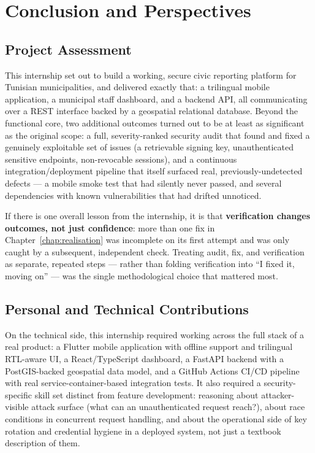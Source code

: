 \chapter{Conclusion and Perspectives}
\label{chap:conclusion}

\section{Project Assessment}

This internship set out to build a working, secure civic reporting platform for Tunisian municipalities, and delivered exactly that: a trilingual mobile application, a municipal staff dashboard, and a backend API, all communicating over a REST interface backed by a geospatial relational database. Beyond the functional core, two additional outcomes turned out to be at least as significant as the original scope: a full, severity-ranked security audit that found and fixed a genuinely exploitable set of issues (a retrievable signing key, unauthenticated sensitive endpoints, non-revocable sessions), and a continuous integration/deployment pipeline that itself surfaced real, previously-undetected defects --- a mobile smoke test that had silently never passed, and several dependencies with known vulnerabilities that had drifted unnoticed.

If there is one overall lesson from the internship, it is that \textbf{verification changes outcomes, not just confidence}: more than one fix in Chapter~\ref{chap:realisation} was incomplete on its first attempt and was only caught by a subsequent, independent check. Treating audit, fix, and verification as separate, repeated steps --- rather than folding verification into ``I fixed it, moving on'' --- was the single methodological choice that mattered most.

\section{Personal and Technical Contributions}

On the technical side, this internship required working across the full stack of a real product: a Flutter mobile application with offline support and trilingual RTL-aware UI, a React/TypeScript dashboard, a FastAPI backend with a PostGIS-backed geospatial data model, and a GitHub Actions CI/CD pipeline with real service-container-based integration tests. It also required a security-specific skill set distinct from feature development: reasoning about attacker-visible attack surface (what can an unauthenticated request reach?), about race conditions in concurrent request handling, and about the operational side of key rotation and credential hygiene in a deployed system, not just a textbook description of them.

